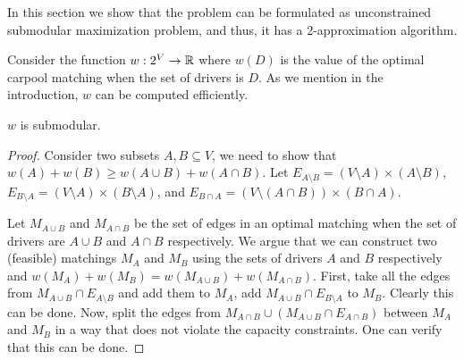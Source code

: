 In this section we show that the problem can be formulated as unconstrained
submodular maximization problem, and thus, it has a 2-approximation algorithm.

Consider the function $w : 2^V \to \mathbb{R}$ where $w(D)$ is the value of the optimal
carpool matching when the set of drivers is $D$.
As we mention in the introduction, $w$ can be computed efficiently.

\begin{theorem}
$w$ is submodular.
\end{theorem}

\begin{proof}
Consider two subsets $A,B \subseteq V$, 
we need to show that $w(A) + w(B) \geq w(A \cup B) + w(A \cap B)$.
Let $E_{A \setminus B} = (V \setminus A) \times (A \setminus B)$, 
$E_{B \setminus A} = (V \setminus A) \times (B \setminus A)$,
and $E_{B \cap A} = (V \setminus (A \cap B)) \times (B \cap A)$.
 
Let $M_{A \cup B}$ and $M_{A \cap B}$ be the set of edges in an optimal
matching when the set of drivers are $A \cup B$ and $A \cap B$ respectively.
We argue that we can construct two (feasible) matchings $M_A$ and $M_B$ using
the sets of drivers $A$ and $B$ respectively and 
$w(M_A) + w(M_B) = w(M_{A \cup B}) + w(M_{A \cap B})$.
First, take all the edges from $M_{A \cup B} \cap E_{A \setminus B}$ and 
add them to $M_A$, 
add $M_{A \cup B} \cap E_{B \setminus A}$ to $M_B$.
Clearly this can be done.
Now, split the edges from $M_{A \cap B} \cup (M_{A \cup B} \cap E_{A \cap B})$
between $M_A$ and $M_B$ in a way that does not violate the capacity constraints.
One can verify that this can be done.
\end{proof}
